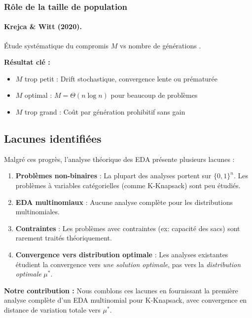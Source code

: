 \documentclass[12pt,a4paper]{article}
\theoremstyle{definition}
\theoremstyle{remark}
\begin{document}
\subsubsection{Rôle de la taille de population}

\paragraph{Krejca \& Witt (2020).}
Étude systématique du compromis $M$ vs nombre de générations \cite{krejca2020lower}.

\textbf{Résultat clé :}
\begin{itemize}
    \item $M$ trop petit : Drift stochastique, convergence lente ou prématurée
    \item $M$ optimal : $M = \Theta(n \log n)$ pour beaucoup de problèmes
    \item $M$ trop grand : Coût par génération prohibitif sans gain
\end{itemize}

\subsection{Lacunes identifiées}

Malgré ces progrès, l'analyse théorique des EDA présente plusieurs lacunes :

\begin{enumerate}
    \item \textbf{Problèmes non-binaires} : La plupart des analyses portent sur $\{0,1\}^n$. Les problèmes à variables catégorielles (comme K-Knapsack) sont peu étudiés.
    
    \item \textbf{EDA multinomiaux} : Aucune analyse complète pour les distributions multinomiales.
    
    \item \textbf{Contraintes} : Les problèmes avec contraintes (ex: capacité des sacs) sont rarement traités théoriquement.
    
    \item \textbf{Convergence vers distribution optimale} : Les analyses existantes étudient la convergence vers \emph{une solution optimale}, pas vers la \emph{distribution optimale} $\mu^*$.
\end{enumerate}

\textbf{Notre contribution :} Nous comblons ces lacunes en fournissant la première analyse complète d'un EDA multinomial pour K-Knapsack, avec convergence en distance de variation totale vers $\mu^*$.
\end{document}
